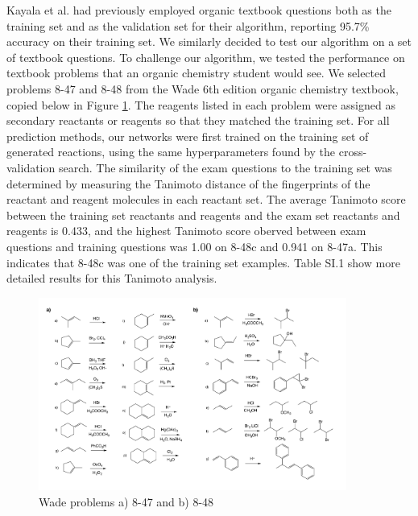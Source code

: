Kayala et al.\cite{Kayala_2012} had previously employed organic textbook questions both as the training set and as the validation set for their algorithm, reporting 95.7\% accuracy on their training set. We similarly decided to test our algorithm on a set of textbook questions. To challenge our algorithm, we tested the performance on textbook problems that an organic chemistry student would see. We selected problems 8-47 and 8-48 from the Wade 6th edition organic chemistry textbook, copied below in Figure \ref{fig:Wade_problems_copy}.\cite{wade2013organic} The reagents listed in each problem were assigned as secondary reactants or reagents so that they matched the training set. For all prediction methods, our networks were first trained on the training set of generated reactions, using the same hyperparameters found by the cross-validation search. The similarity of the exam questions to the training set was determined by measuring the Tanimoto\cite{Bajusz_2015} distance of the fingerprints of the reactant and reagent molecules in each reactant set. The average Tanimoto score between the training set reactants and reagents and the exam set reactants and reagents is 0.433, and the highest Tanimoto score oberved between exam questions and training questions was 1.00 on 8-48c and 0.941 on 8-47a. This indicates that 8-48c was one of the training set examples. Table SI.1  show more detailed results for this Tanimoto analysis.

\begin{figure}
\begin{center}
\includegraphics[width=0.9\textwidth]{Wade_problems}
\caption{\label{fig:Wade_problems_copy} Wade problems a) 8-47 and b) 8-48}
\end{center}
\end{figure}

